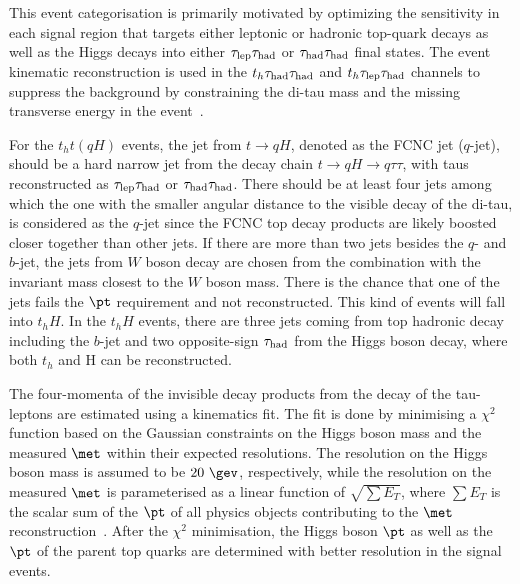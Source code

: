 This event categorisation is primarily motivated by optimizing the sensitivity in each signal region that targets either leptonic or hadronic top-quark
decays as well as the Higgs decays into either $\tau_{\mathrm{lep}} \tau_{\mathrm{had}}$ or $\tau_{\mathrm{had}} \tau_{\mathrm{had}}$ final states.   
The event kinematic reconstruction is used in the $t_h\tau_{\mathrm{had}} \tau_{\mathrm{had}}$ and $t_h\tau_{\mathrm{lep}} \tau_{\mathrm{had}}$ channels to suppress the background by constraining the
di-tau mass and the missing transverse energy in the event~\cite{Chen:2015nta}. 

For the $t_ht(qH)$ events, the jet from $t\to qH$, denoted as the FCNC jet ($q$-jet), should be a hard narrow jet from the
decay chain $t\to qH\to q\tau\tau$, with taus reconstructed as $\tau_{\mathrm{lep}} \tau_{\mathrm{had}}$ or $\tau_{\mathrm{had}} \tau_{\mathrm{had}}$.
There should be at least four jets among which the one with the smaller angular distance to the visible decay of the di-tau,
is considered as the $q$-jet since the FCNC top decay products are likely boosted closer together than other jets. 
If there are more than two jets besides the $q$- and $b$-jet, the jets from $W$ boson decay are chosen from the combination
with the invariant mass closest to the $W$ boson mass. There is the chance that one of the jets fails the $\pt$ requirement and not reconstructed.
This kind of events will fall into $t_hH$.
In the $t_hH$ events, there are three jets coming from top hadronic decay including the $b$-jet and two opposite-sign $\tau_{\mathrm{had}}$ from the Higgs boson decay, where
both $t_h$ and H can be reconstructed.  

The four-momenta of the invisible decay products from the decay of the tau-leptons 
are estimated using a kinematics fit. The fit is done by minimising a $\chi^2$ function based on the Gaussian constraints on the Higgs boson mass and the
measured $\met$ within their expected resolutions. The resolution on the Higgs boson mass is assumed to be $20~\gev$, respectively, while the resolution on the measured $\met$ is parameterised as a linear function of 
$\sqrt{\sum E_T}$, where $\sum E_T$ is the scalar sum of the $\pt$ of all physics objects contributing to the $\met$ reconstruction~\cite{Aaboud:2018tkc}.
After the $\chi^2$ minimisation, the Higgs boson $\pt$ as well as the 
$\pt$ of the parent top quarks are determined with better resolution in the signal events. 

